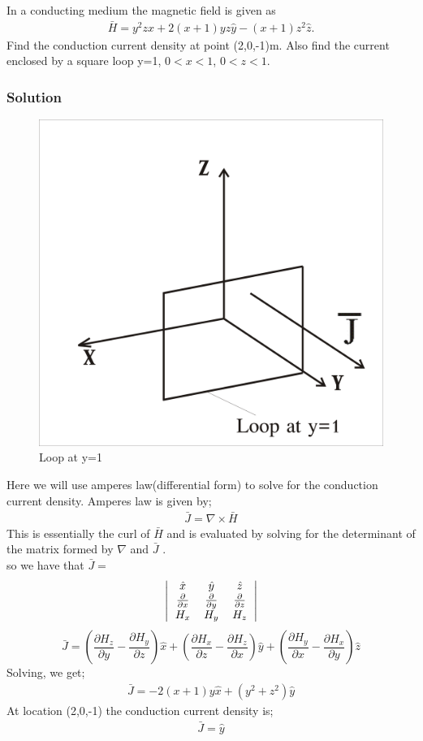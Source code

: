 \begin{exmp}
In a conducting medium the magnetic field is given as
\begin{align*}
\bar{H}=y^{2}z\hat{x}+2(x+1)yz\hat{y}-(x+1)z^{2}\hat{z}.
\end{align*}
Find the conduction current density at point (2,0,-1)m. Also find the current enclosed by a square loop y=1, $0<x<1$, $0<z<1$.
\subsubsection*{Solution}
\begin{figure}[h]
\centering
\includegraphics[width=.5\linewidth]{./graphics/problem3b}
\caption{Loop at y=1}
\end{figure} 

Here we will use amperes law(differential form) to solve for the conduction current density. Amperes law is given by;
\begin{align*}
\bar{J}=\nabla\times\bar{H}
\end{align*}
This is essentially the curl of $\bar{H}$ and is evaluated by solving for the determinant of the matrix formed by $\nabla$ and $\bar{J}$ .\\
so we have that $\bar{J} =$
\[
\left|
\begin{tabular}{c c c}
$\hat{x}$ & $\hat{y}$ & $\hat{z}$\\
$\frac{\partial}{\partial x}$ & $\frac{\partial}{\partial y}$ & $\frac{\partial}{\partial z}$\\
$H_{x}$ & $H_{y}$ & $H_{z}$
\end{tabular}
\right|
\]
\begin{dmath*}
\bar{J}= (\frac{\partial H_{z}}{\partial y}-\frac{\partial H_{y}}{\partial z})\hat{x}+ (\frac{\partial H_{x}}{\partial z}-\frac{\partial H_{z}}{\partial x})\hat{y}+ (\frac{\partial H_{y}}{\partial x}-\frac{\partial H_{x}}{\partial y})\hat{z}
\end{dmath*}
Solving, we get;
\begin{align*}
\bar{J}=-2(x+1)y\hat{x}+(y^{2}+z^{2})\hat{y}
\end{align*}
At location (2,0,-1) the conduction current density is;
\begin{align*}
\bar{J}=\hat{y}
\end{align*}


\end{exmp}
